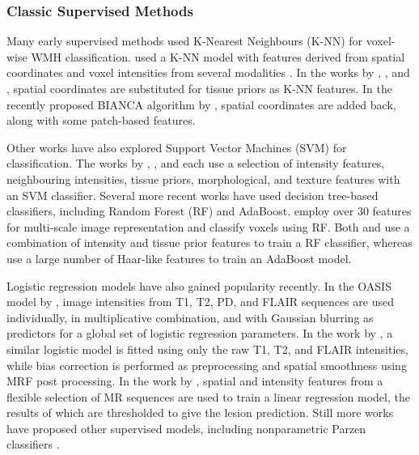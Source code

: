 \subsubsection{Classic Supervised Methods}
Many early supervised methods used K-Nearest Neighbours (K-NN) for voxel-wise WMH classification.
\citeauthor{Anbeek2005} used a K-NN model with features derived from spatial coordinates and voxel intensities from several modalities \cite{Anbeek2004,Anbeek2005}.
In the works by \citeauthor{Wu2006} \cite{Wu2006}, \citeauthor{Steenwijk2013} \cite{Steenwijk2013}, and \citeauthor{Fartaria2015} \cite{Fartaria2015}, spatial coordinates are substituted for tissue priors as K-NN features.
In the recently proposed BIANCA algorithm by \citeauthor{Griffanti2016} \cite{Griffanti2016}, spatial coordinates are added back, along with some patch-based features.
\par
Other works have also explored Support Vector Machines (SVM) for classification.
The works by \citeauthor{Lao2006} \cite{Lao2006}, \citeauthor{Abdullah2012} \cite{Abdullah2012}, and \citeauthor{Scully2010} \cite{Scully2010} each use a selection of intensity features, neighbouring intensities, tissue priors, morphological, and texture features with an SVM classifier.
Several more recent works have used decision tree-based classifiers, including Random Forest (RF) and AdaBoost.
\citeauthor{Akselrod-Ballin2009} \cite{Akselrod-Ballin2009} employ over 30 features for multi-scale image representation and classify voxels using RF.
Both \citeauthor{Geremia2011} \cite{Geremia2011} and \citeauthor{Roy2015} \cite{Roy2015} use a combination of intensity and tissue prior features to train a RF classifier, whereas \citeauthor{Wels2008} \cite{Wels2008} use a large number of Haar-like features to train an AdaBoost model.
\par
Logistic regression models have also gained popularity recently.
In the OASIS model by \citeauthor{Sweeney2013} \cite{Sweeney2013}, image intensities from T1, T2, PD, and FLAIR sequences are used individually, in multiplicative combination, and with Gaussian blurring as predictors for a global set of logistic regression parameters.
In the work by \citeauthor{Zhan2017} \cite{Zhan2017}, a similar logistic model is fitted using only the raw T1, T2, and FLAIR intensities, while bias correction is performed as preprocessing and spatial smoothness using MRF post processing.
In the work by \citeauthor{Dadar2017} \cite{Dadar2017}, spatial and intensity features from a flexible selection of MR sequences are used to train a linear regression model, the results of which are thresholded to give the lesion prediction.
Still more works have proposed other supervised models, including nonparametric Parzen classifiers \cite{Sajja2006}.

